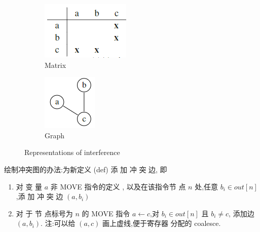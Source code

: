 \begin{figure}[H]
    \centering
    \begin{subfigure}{0.24\linewidth}
        \centering
        \includegraphics[width=\textwidth]{pic/CP10/Matrix.png}
        \caption{Matrix}
    \end{subfigure}
    \begin{subfigure}{0.16\linewidth}
        \centering
        \includegraphics[width=\textwidth]{pic/CP10/Graph.png}
        \caption{Graph}
    \end{subfigure}
    \caption{Representations of interference}
\end{figure}


绘制冲突图的办法:为新定义 (def) 添 加 冲 突 边, 即
\begin{enumerate}
    \item 对 变 量 $a$ 非 MOVE 指令的定义 , 以及在该指令节 点 $n$ 处,任意 $b_i\in out[n]$,添 加 冲 突 边 $(a,b_i)$
    \item 对 于 节 点标号为 $n$ 的 MOVE 指令 $a\leftarrow c$,对 $b_i\in out[n]$ 且 $b_i\ne c$, 添加边 $(a,b_i)$. 
    \subitem 注:可以给 $(a,c)$ 画上虚线,便于寄存器 分配的 coalesce.
\end{enumerate}


